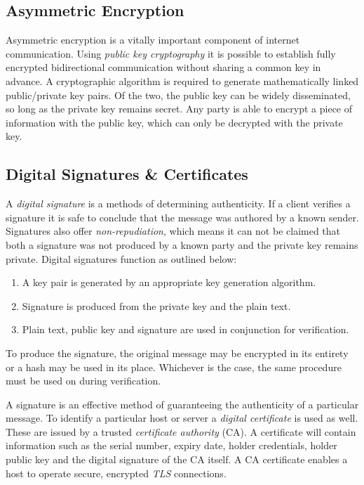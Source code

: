 \documentclass[10pt]{article}
\begin{document}
\subsection{Asymmetric Encryption}
\label{sec:org4137776}

Asymmetric encryption is a vitally important component of internet communication. Using \emph{public key cryptography} it is possible to establish fully encrypted bidirectional communication without sharing a common key in advance. A cryptographic algorithm is required to generate mathematically linked public/private key pairs. Of the two, the public key can be widely disseminated, so long as the private key remains secret. Any party is able to encrypt a piece of information with the public key, which can only be decrypted with the private key.

\subsection{Digital Signatures \& Certificates}
\label{sec:org72f3306}

A \emph{digital signature} is a methods of determining authenticity. If a client verifies a signature it is safe to conclude that the message was authored by a known sender. Signatures also offer \emph{non-repudiation}, which means it can not be claimed that both a signature was not produced by a known party and the private key remains private. Digital signatures function as outlined below:

\begin{enumerate}
\item A key pair is generated by an appropriate key generation algorithm.
\item Signature is produced from the private key and the plain text.
\item Plain text, public key and signature are used in conjunction for verification.
\end{enumerate}

To produce the signature, the original message may be encrypted in its entirety or a hash may be used in its place. Whichever is the case, the same procedure must be used on during verification.

A signature is an effective method of guaranteeing the authenticity of a particular message. To identify a particular host or server a \emph{digital certificate} is used as well. These are issued by a trusted \emph{certificate authority} (CA). A certificate will contain information such as the serial number, expiry date, holder credentials, holder public key and the digital signature of the CA itself. A CA certificate enables a host to operate secure, encrypted \emph{TLS} connections.
\end{document}
